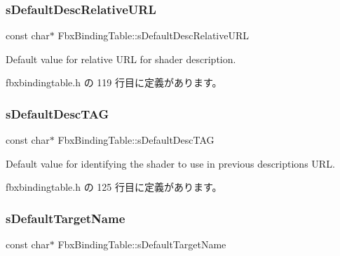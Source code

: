 \subsubsection{\texorpdfstring{s\+Default\+Desc\+Relative\+U\+RL}{sDefaultDescRelativeURL}}
{\footnotesize\ttfamily const char$\ast$ Fbx\+Binding\+Table\+::s\+Default\+Desc\+Relative\+U\+RL\hspace{0.3cm}{\ttfamily [static]}}



Default value for relative U\+RL for shader description. 



 fbxbindingtable.\+h の 119 行目に定義があります。

\mbox{\label{class_fbx_binding_table_aec5add4fb938c15ee77ee75a55676ced}} 
\subsubsection{\texorpdfstring{s\+Default\+Desc\+T\+AG}{sDefaultDescTAG}}
{\footnotesize\ttfamily const char$\ast$ Fbx\+Binding\+Table\+::s\+Default\+Desc\+T\+AG\hspace{0.3cm}{\ttfamily [static]}}



Default value for identifying the shader to use in previous description\textquotesingle{}s U\+RL. 



 fbxbindingtable.\+h の 125 行目に定義があります。

\mbox{\label{class_fbx_binding_table_a455a2c80eb702925e9e993c79eb548fb}} 
\subsubsection{\texorpdfstring{s\+Default\+Target\+Name}{sDefaultTargetName}}
{\footnotesize\ttfamily const char$\ast$ Fbx\+Binding\+Table\+::s\+Default\+Target\+Name\hspace{0.3cm}{\ttfamily [static]}}



